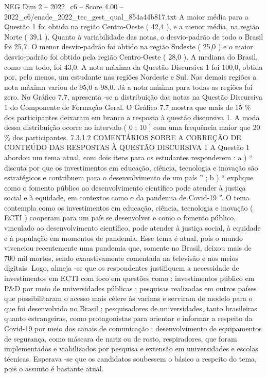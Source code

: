 \begin{textsample}{NEG Dim 2 – 2022\_c6 – Score 4.00 – 2022\_c6/enade\_2022\_tec\_gest\_qual\_854a44b817.txt}
A maior média para a Questão 1 foi obtida na região Centro-Oeste ( 42,4 ), e a menor média, na região Norte ( 39,1 ).
Quanto à variabilidade das notas, o desvio-padrão de todo o Brasil foi 25,7.
O menor desvio-padrão foi obtido na região Sudeste ( 25,0 ) e o maior desvio-padrão foi obtido pela região Centro-Oeste ( 28,0 ).
A mediana do Brasil, como um todo, foi 43,0.
A nota máxima da Questão Discursiva 1 foi 100,0, obtida por, pelo menos, um estudante nas regiões Nordeste e Sul.
Nas demais regiões a nota máxima variou de 95,0 a 98,0.
Já a nota mínima para todas as regiões foi zero.
No Gráfico 7.7, apresenta -se a distribuição das notas na Questão Discursiva 1 do Componente de Formação Geral.
O Gráfico 7.7 mostra que mais de 15 \% dos participantes deixaram em branco a resposta à questão discursiva 1.
A moda dessa distribuição ocorre no intervalo ( 0 ; 10 ] com uma frequência maior que 20 \% dos participantes. 7.3.1.2 COMENTÁRIOS SOBRE A CORREÇÃO DE CONTEÚDO DAS RESPOSTAS À QUESTÃO DISCURSIVA 1 A Questão 1 abordou um tema atual, com dois itens para os estudantes responderem : a ) “ discuta por que os investimentos em educação, ciência, tecnologia e inovação são estratégicos e contribuem para o desenvolvimento de um país ” ; b ) “ explique como o fomento público ao desenvolvimento científico pode atender à justiça social e à equidade, em contextos como o da pandemia de Covid-19 ”.
O tema contempla como os investimentos em educação, ciência, tecnologia e inovação ( ECTI ) cooperam para um país se desenvolver e como o fomento público, vinculado ao desenvolvimento científico, pode atender à justiça social, à equidade e à população em momentos de pandemia.
Esse tema é atual, pois o mundo vivenciou recentemente uma pandemia que, somente no Brasil, deixou mais de 700 mil mortos, sendo exaustivamente comentada na televisão e nos meios digitais.
Logo, almeja -se que os respondentes justifiquem a necessidade de investimentos em ECTI com foco em questões como : investimentos público em P\&D por meio de universidades públicas ; pesquisas realizadas em outros países que possibilitaram o acesso mais célere às vacinas e serviram de modelo para o que foi desenvolvido no Brasil ; pesquisadores de universidades, tanto brasileiras quanto estrangeiras, como protagonistas para orientar e informar a respeito da Covid-19 por meio dos canais de comunicação ; desenvolvimento de equipamentos de segurança, como máscara de nariz ou de rosto, respiradores, que foram implementados e viabilizados por pesquisa e extensão em universidades e escolas técnicas.
Esperava -se que os candidatos soubessem o básico a respeito do tema, pois o assunto é bastante atual.

\end{textsample}

